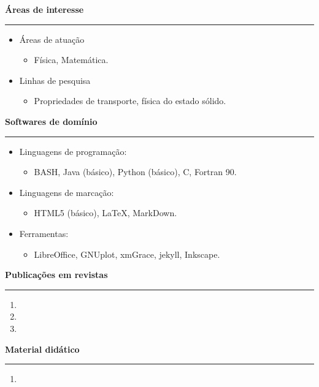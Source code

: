 \documentclass[
   12pt,                         %
   a4paper,                      %
   spanish,                      %
   brazil,                       %
   xcolor=table                  %
]{abntex2}
\newcommand{\customtitle}[1]{\noindent\textbf{\large#1}\vspace{2pt}\hrule}
\begin{document}
\customtitle{Áreas de interesse}

   \begin{itemize}[nosep]

      \item[ ] Áreas de atuação
      \begin{itemize}[nosep]
        \item[ ] Física, Matemática.
      \end{itemize}


      \item[ ] Linhas de pesquisa
      \begin{itemize}[nosep]
        \item[ ] Propriedades de transporte, física do estado sólido.
      \end{itemize}

   \end{itemize}

\customtitle{Softwares de domínio}

   \begin{itemize}[nosep]
      \item[ ] Linguagens de programação:
      \begin{itemize}[nosep]
         \item[ ] BASH, Java (básico), Python (básico), C, Fortran 90.
      \end{itemize}

      \item[ ] Linguagens de marcação:
      \begin{itemize}[nosep]
         \item[ ] HTML5 (básico), \LaTeX, MarkDown.
      \end{itemize}

      \item[ ] Ferramentas:
      \begin{itemize}[nosep]
         \item[ ] LibreOffice, GNUplot, xmGrace, jekyll, Inkscape.
      \end{itemize}
   \end{itemize}

\customtitle{Publicações em revistas}

   \begin{enumerate}[nosep]
      \item {}
      \item {}
      \item {}
   \end{enumerate}

\customtitle{Material didático}  

   \begin{enumerate}[nosep]
      \item {}
   \end{enumerate}
\end{document}
